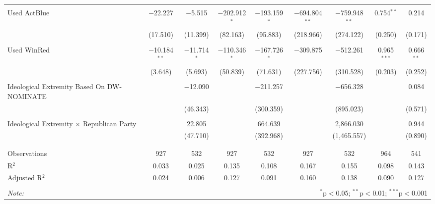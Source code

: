 \begin{tabular}{@{\extracolsep{5pt}}lcccccccc}
  & & & & & & & & \\ 
 Used ActBlue & $-$22.227 & $-$5.515 & $-$202.912$^{*}$ & $-$193.159$^{*}$ & $-$694.804$^{**}$ & $-$759.948$^{**}$ & 0.754$^{**}$ & 0.214 \\ 
  & (17.510) & (11.399) & (82.163) & (95.883) & (218.966) & (274.122) & (0.250) & (0.171) \\ 
  & & & & & & & & \\ 
 Used WinRed & $-$10.184$^{**}$ & $-$11.714$^{*}$ & $-$110.346$^{*}$ & $-$167.726$^{*}$ & $-$309.875 & $-$512.261 & 0.965$^{***}$ & 0.666$^{**}$ \\ 
  & (3.648) & (5.693) & (50.839) & (71.631) & (227.756) & (310.528) & (0.203) & (0.252) \\ 
  & & & & & & & & \\ 
 Ideological Extremity Based On DW-NOMINATE &  & $-$12.090 &  & $-$211.257 &  & $-$656.328 &  & 0.084 \\ 
  &  & (46.343) &  & (300.359) &  & (895.023) &  & (0.571) \\ 
  & & & & & & & & \\ 
 Ideological Extremity $\times$ Republican Party &  & 22.805 &  & 664.639 &  & 2,866.030 &  & 0.944 \\ 
  &  & (47.710) &  & (392.968) &  & (1,465.557) &  & (0.890) \\ 
  & & & & & & & & \\ 
\hline \\[-1.8ex] 
Observations & 927 & 532 & 927 & 532 & 927 & 532 & 964 & 541 \\ 
R$^{2}$ & 0.033 & 0.025 & 0.135 & 0.108 & 0.167 & 0.155 & 0.098 & 0.143 \\ 
Adjusted R$^{2}$ & 0.024 & 0.006 & 0.127 & 0.091 & 0.160 & 0.138 & 0.090 & 0.127 \\ 
\hline 
\hline \\[-1.8ex] 
\textit{Note:}  & \multicolumn{8}{r}{$^{*}$p$<$0.05; $^{**}$p$<$0.01; $^{***}$p$<$0.001} \\ 
\end{tabular} 
